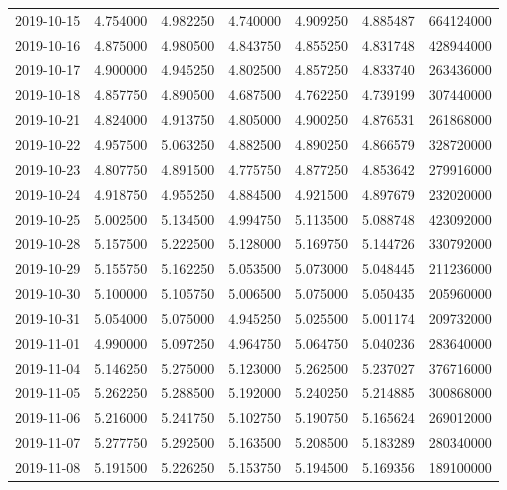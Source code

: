 \begin{tabular}{lrrrrrr}
2019-10-15 &    4.754000 &    4.982250 &    4.740000 &    4.909250 &    4.885487 &   664124000 \\
2019-10-16 &    4.875000 &    4.980500 &    4.843750 &    4.855250 &    4.831748 &   428944000 \\
2019-10-17 &    4.900000 &    4.945250 &    4.802500 &    4.857250 &    4.833740 &   263436000 \\
2019-10-18 &    4.857750 &    4.890500 &    4.687500 &    4.762250 &    4.739199 &   307440000 \\
2019-10-21 &    4.824000 &    4.913750 &    4.805000 &    4.900250 &    4.876531 &   261868000 \\
2019-10-22 &    4.957500 &    5.063250 &    4.882500 &    4.890250 &    4.866579 &   328720000 \\
2019-10-23 &    4.807750 &    4.891500 &    4.775750 &    4.877250 &    4.853642 &   279916000 \\
2019-10-24 &    4.918750 &    4.955250 &    4.884500 &    4.921500 &    4.897679 &   232020000 \\
2019-10-25 &    5.002500 &    5.134500 &    4.994750 &    5.113500 &    5.088748 &   423092000 \\
2019-10-28 &    5.157500 &    5.222500 &    5.128000 &    5.169750 &    5.144726 &   330792000 \\
2019-10-29 &    5.155750 &    5.162250 &    5.053500 &    5.073000 &    5.048445 &   211236000 \\
2019-10-30 &    5.100000 &    5.105750 &    5.006500 &    5.075000 &    5.050435 &   205960000 \\
2019-10-31 &    5.054000 &    5.075000 &    4.945250 &    5.025500 &    5.001174 &   209732000 \\
2019-11-01 &    4.990000 &    5.097250 &    4.964750 &    5.064750 &    5.040236 &   283640000 \\
2019-11-04 &    5.146250 &    5.275000 &    5.123000 &    5.262500 &    5.237027 &   376716000 \\
2019-11-05 &    5.262250 &    5.288500 &    5.192000 &    5.240250 &    5.214885 &   300868000 \\
2019-11-06 &    5.216000 &    5.241750 &    5.102750 &    5.190750 &    5.165624 &   269012000 \\
2019-11-07 &    5.277750 &    5.292500 &    5.163500 &    5.208500 &    5.183289 &   280340000 \\
2019-11-08 &    5.191500 &    5.226250 &    5.153750 &    5.194500 &    5.169356 &   189100000 \\

\end{tabular}
